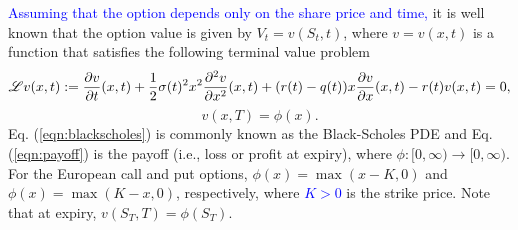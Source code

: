 \textcolor{blue}{Assuming that the option depends only on the share price and time,} it is well known that the option value is given by $V_t = v(S_t,t)$, where $v = v(x,t)$ is a function that satisfies the following terminal value problem
	\begin{equation}
		\label{eqn:blackscholes}
		\mathscr L v(x,t) := \frac{\partial v}{\partial t}(x,t) + \frac{1}{2}\sigma(t)^2x^2\frac{\partial^2 v}{\partial x^2}(x,t) + (r(t)-q(t))x\frac{\partial v}{\partial x}(x,t) - r(t)v(x,t) = 0,
	\end{equation}
	\begin{equation}
		\label{eqn:payoff}
		v(x,T) = \phi(x).
	\end{equation}
Eq. (\ref{eqn:blackscholes}) is commonly known as the Black-Scholes PDE and Eq. (\ref{eqn:payoff}) is the payoff (i.e., loss or profit at expiry), where $\phi : [0,\infty) \rightarrow [0, \infty)$. For the European call and put options, $\phi(x) = \max(x-K,0)$ and $\phi(x) = \max(K-x,0)$, respectively, where \textcolor{blue}{$K > 0$} is the strike price. Note that at expiry, $v(S_T,T) = \phi(S_T)$.

